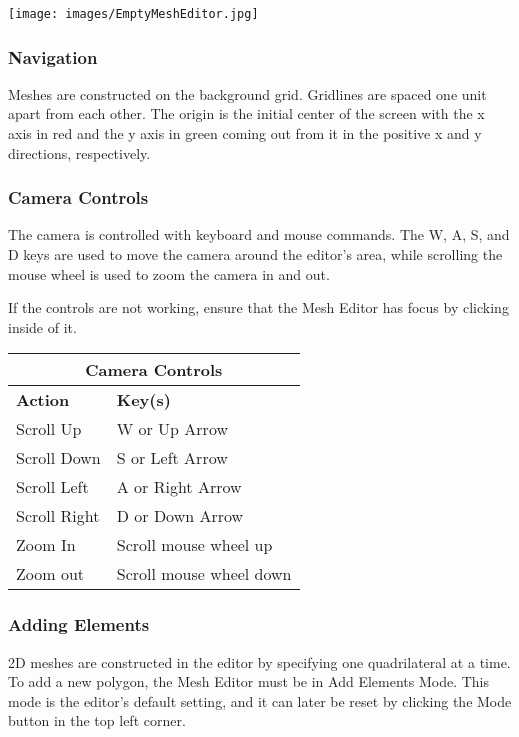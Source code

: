\begin{center}
\texttt{[image: images/EmptyMeshEditor.jpg]}
\end{center}

\subsubsection{Navigation}

Meshes are constructed on the background grid. Gridlines are spaced one unit
apart from each other. The origin is the initial center of the screen with the
x axis in red and the y axis in green coming out from it in the positive x and y
directions, respectively. 

\subsubsection{Camera Controls}

The camera is controlled with keyboard and mouse commands. The W, A, S, and D
keys are used to move the camera around the editor's area, while scrolling the
mouse wheel is used to zoom the camera in and out. 

If the controls are not working, ensure that the Mesh Editor has focus by
clicking inside of it.

\begin{center}
    \begin{tabular}{| l | l |}
    \hline
    \multicolumn{2}{|c|}{\textbf{Camera Controls}} \\
  	\hline
    \textbf{Action} & \textbf{Key(s)} \\ \hline
    Scroll Up & W or Up Arrow\\ \hline
    Scroll Down & S or Left Arrow\\ \hline
    Scroll Left & A or Right Arrow\\ \hline
    Scroll Right & D or Down Arrow\\ \hline
    Zoom In & Scroll mouse wheel up \\ \hline
    Zoom out & Scroll mouse wheel down \\
    \hline
    \end{tabular}
\end{center}

\subsubsection{Adding Elements}

2D meshes are constructed in the editor by specifying one quadrilateral at a
time. To add a new polygon, the Mesh Editor must be in Add Elements Mode. This
mode is the editor's default setting, and it can later be reset by clicking the
Mode button in the top left corner. 

